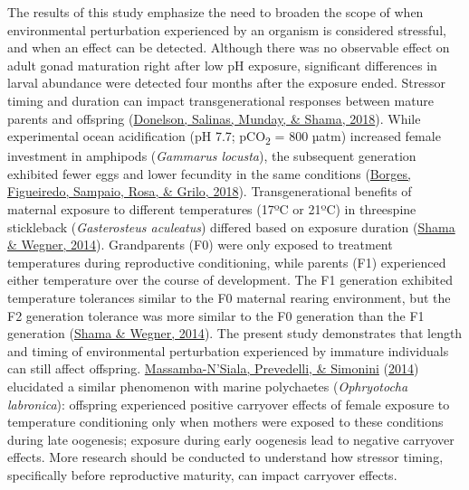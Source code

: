 \documentclass [11pt, proquest] {uwthesis}[2015/03/03]
\begin{document}
The results of this study emphasize the need to broaden the scope of when environmental perturbation experienced by an organism is considered stressful, and when an effect can be detected. Although there was no observable effect on adult gonad maturation right after low pH exposure, significant differences in larval abundance were detected four months after the exposure ended. Stressor timing and duration can impact transgenerational responses between mature parents and offspring (\protect\hyperlink{ref-Donelson2018}{Donelson, Salinas, Munday, \& Shama, 2018}). While experimental ocean acidification (pH 7.7; pCO\textsubscript{2} = 800 µatm) increased female investment in amphipods (\emph{Gammarus locusta}), the subsequent generation exhibited fewer eggs and lower fecundity in the same conditions (\protect\hyperlink{ref-Borges2018}{Borges, Figueiredo, Sampaio, Rosa, \& Grilo, 2018}). Transgenerational benefits of maternal exposure to different temperatures (17ºC or 21ºC) in threespine stickleback (\emph{Gasterosteus aculeatus}) differed based on exposure duration (\protect\hyperlink{ref-Shama2014}{Shama \& Wegner, 2014}). Grandparents (F0) were only exposed to treatment temperatures during reproductive conditioning, while parents (F1) experienced either temperature over the course of development. The F1 generation exhibited temperature tolerances similar to the F0 maternal rearing environment, but the F2 generation tolerance was more similar to the F0 generation than the F1 generation (\protect\hyperlink{ref-Shama2014}{Shama \& Wegner, 2014}). The present study demonstrates that length and timing of environmental perturbation experienced by immature individuals can still affect offspring. \protect\hyperlink{ref-Massamba-NSiala2014}{Massamba-N'Siala, Prevedelli, \& Simonini} (\protect\hyperlink{ref-Massamba-NSiala2014}{2014}) elucidated a similar phenomenon with marine polychaetes (\emph{Ophryotocha labronica}): offspring experienced positive carryover effects of female exposure to temperature conditioning only when mothers were exposed to these conditions during late oogenesis; exposure during early oogenesis lead to negative carryover effects. More research should be conducted to understand how stressor timing, specifically before reproductive maturity, can impact carryover effects.
\end{document}
